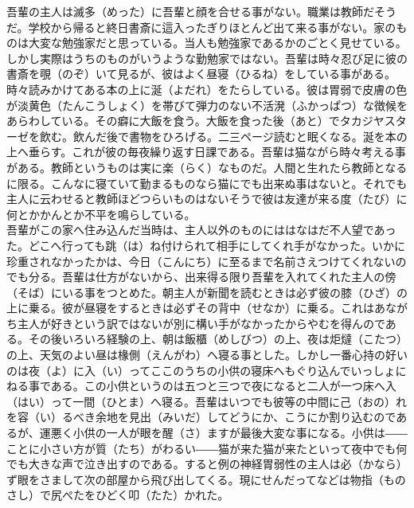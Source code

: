 \documentclass{book}
\begin{document}
吾輩の主人は滅多（めった）に吾輩と顔を合せる事がない。職業は教師だそうだ。学校から帰ると終日書斎に這入ったぎりほとんど出て来る事がない。家のものは大変な勉強家だと思っている。当人も勉強家であるかのごとく見せている。しかし実際はうちのものがいうような勤勉家ではない。吾輩は時々忍び足に彼の書斎を覗（のぞ）いて見るが、彼はよく昼寝（ひるね）をしている事がある。時々読みかけてある本の上に涎（よだれ）をたらしている。彼は胃弱で皮膚の色が淡黄色（たんこうしょく）を帯びて弾力のない不活溌（ふかっぱつ）な徴候をあらわしている。その癖に大飯を食う。大飯を食った後（あと）でタカジヤスターゼを飲む。飲んだ後で書物をひろげる。二三ページ読むと眠くなる。涎を本の上へ垂らす。これが彼の毎夜繰り返す日課である。吾輩は猫ながら時々考える事がある。教師というものは実に楽（らく）なものだ。人間と生れたら教師となるに限る。こんなに寝ていて勤まるものなら猫にでも出来ぬ事はないと。それでも主人に云わせると教師ほどつらいものはないそうで彼は友達が来る度（たび）に何とかかんとか不平を鳴らしている。\\
吾輩がこの家へ住み込んだ当時は、主人以外のものにははなはだ不人望であった。どこへ行っても跳（は）ね付けられて相手にしてくれ手がなかった。いかに珍重されなかったかは、今日（こんにち）に至るまで名前さえつけてくれないのでも分る。吾輩は仕方がないから、出来得る限り吾輩を入れてくれた主人の傍（そば）にいる事をつとめた。朝主人が新聞を読むときは必ず彼の膝（ひざ）の上に乗る。彼が昼寝をするときは必ずその背中（せなか）に乗る。これはあながち主人が好きという訳ではないが別に構い手がなかったからやむを得んのである。その後いろいろ経験の上、朝は飯櫃（めしびつ）の上、夜は炬燵（こたつ）の上、天気のよい昼は椽側（えんがわ）へ寝る事とした。しかし一番心持の好いのは夜（よ）に入（い）ってここのうちの小供の寝床へもぐり込んでいっしょにねる事である。この小供というのは五つと三つで夜になると二人が一つ床へ入（はい）って一間（ひとま）へ寝る。吾輩はいつでも彼等の中間に己（おの）れを容（い）るべき余地を見出（みいだ）してどうにか、こうにか割り込むのであるが、運悪く小供の一人が眼を醒（さ）ますが最後大変な事になる。小供は――ことに小さい方が質（たち）がわるい――猫が来た猫が来たといって夜中でも何でも大きな声で泣き出すのである。すると例の神経胃弱性の主人は必（かなら）ず眼をさまして次の部屋から飛び出してくる。現にせんだってなどは物指（ものさし）で尻ぺたをひどく叩（たた）かれた。\\
\end{document}
